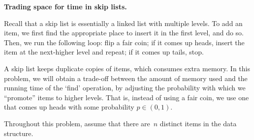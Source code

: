 \documentclass[11pt,addpoints,answers]{exam}
\begin{document}
\begin{questions}
\begin{parts}
  \end{parts}
  
  \pagebreak
  \question \textbf{Trading space for time in skip lists.} 
  \nopagebreak

  Recall that a skip list is essentially a linked list with multiple levels.
  To add an item, we first find the appropriate place to insert it in the first level, and do so.
  Then, we run the following loop: flip a fair coin; if it comes up heads, insert the item at the next-higher level and repeat; if it comes up tails, stop.

  A skip list keeps duplicate copies of items, which consumes extra memory.
  In this problem, we will obtain a trade-off between the amount of memory used and the running time of the `find' operation, by adjusting the probability with which we ``promote'' items to higher levels.
  That is, instead of using a fair coin, we use one that comes up heads with some probability $p \in (0,1)$.

  Throughout this problem, assume that there are~$n$ distinct items in the data structure.
  
\end{questions}
\end{document}
